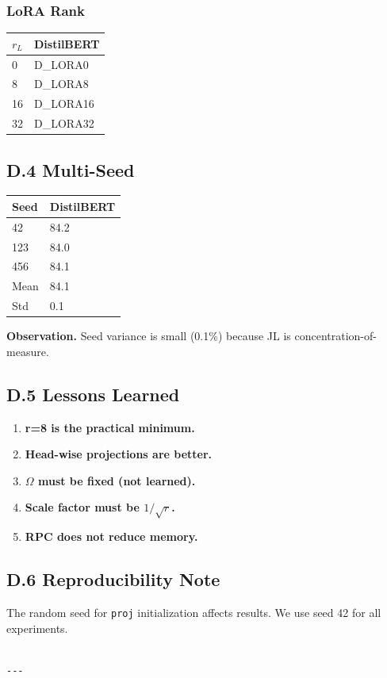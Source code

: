 \subsubsection{LoRA Rank}

\begin{table}[H]
\centering
\small
\begin{tabular}{ll}
\toprule
\textbf{$r_L$} & \textbf{DistilBERT} \\
\midrule
0 & {{D\_LORA0}} \\
8 & {{D\_LORA8}} \\
16 & {{D\_LORA16}} \\
32 & {{D\_LORA32}} \\
\bottomrule
\end{tabular}
\end{table}

\subsection{D.4 Multi-Seed}

\begin{table}[H]
\centering
\small
\begin{tabular}{ll}
\toprule
\textbf{Seed} & \textbf{DistilBERT} \\
\midrule
42 & 84.2 \\
123 & 84.0 \\
456 & 84.1 \\
Mean & 84.1 \\
Std & 0.1 \\
\bottomrule
\end{tabular}
\end{table}

\textbf{Observation.} Seed variance is small (0.1\%) because JL is 
concentration-of-measure.

\subsection{D.5 Lessons Learned}

\begin{enumerate}
\item \textbf{r=8 is the practical minimum.}
\item \textbf{Head-wise projections are better.}
\item \textbf{$\Omega$ must be fixed (not learned).}
\item \textbf{Scale factor must be $1/\sqrt{r}$.}
\item \textbf{RPC does not reduce memory.}

\end{enumerate}
\subsection{D.6 Reproducibility Note}

The random seed for \texttt{proj} initialization affects results. We use seed 
42 for all experiments.
\begin{lstlisting}

---
\end{lstlisting}